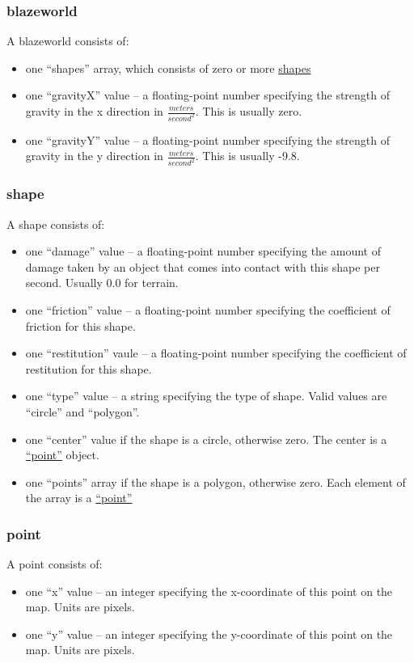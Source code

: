 \documentclass[12pt,letterpaper]{article}
\begin{document}
\subsubsection*{blazeworld}
\label{sec:blazeworld}
A blazeworld consists of:
\begin{itemize}
	\item one ``shapes'' array, which consists of zero or more
		\hyperref[sec:shape]{shapes}
	\item one ``gravityX'' value -- a floating-point number specifying the
		strength of gravity in the x direction in $\frac{meters}{second^{2}}$.
		This is usually zero.
	\item one ``gravityY'' value -- a floating-point number specifying the
		strength of gravity in the y direction in $\frac{meters}{second^{2}}$.
		This is usually -9.8.
\end{itemize}

\subsubsection*{shape}
\label{sec:shape}
A shape consists of:
\begin{itemize}
	\item one ``damage'' value -- a floating-point number specifying the amount
		of damage taken by an object that comes into contact with this shape per
		second. Usually 0.0 for terrain.
	\item one ``friction'' value -- a floating-point number specifying the
		coefficient of friction for this shape.
	\item one ``restitution'' vaule -- a floating-point number specifying the
		coefficient of restitution for this shape.
	\item one ``type'' value -- a string specifying the type of shape. Valid
		values are ``circle'' and ``polygon''.
	\item one ``center'' value if the shape is a circle, otherwise zero. The
		center is a \hyperref[sec:point]{``point''} object.
	\item one ``points'' array if the shape is a polygon, otherwise zero.
		Each element of the array is a \hyperref[sec:point]{``point''}
\end{itemize}


\subsubsection*{point}
\label{sec:point}
A point consists of:
\begin{itemize}
	\item one ``x'' value -- an integer specifying the x-coordinate of this
		point on the map. Units are pixels.
	\item one ``y'' value -- an integer specifying the y-coordinate of this
		point on the map. Units are pixels.
\end{itemize}
\end{document}
